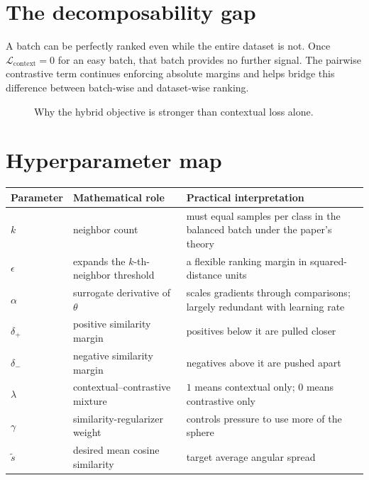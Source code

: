 \documentclass[11pt,oneside,openany]{book}
\theoremstyle{myplain}
\theoremstyle{definition}
\begin{document}
\section{The decomposability gap}

A batch can be perfectly ranked even while the entire dataset is not. Once $\mathcal L_{\mathrm{context}}=0$ for an easy batch, that batch provides no further signal. The pairwise contrastive term continues enforcing absolute margins and helps bridge this difference between batch-wise and dataset-wise ranking.

\begin{figure}[H]
\centering
{}
\caption{Why the hybrid objective is stronger than contextual loss alone.}
\label{fig:decomp-gap}
\end{figure}

\section{Hyperparameter map}

\begin{longtable}{>{\bfseries}p{}p{}p{}}
\toprule
Parameter & Mathematical role & Practical interpretation \\
\midrule
$k$ & neighbor count & must equal samples per class in the balanced batch under the paper's theory \\
$\epsilon$ & expands the $k$-th-neighbor threshold & a flexible ranking margin in squared-distance units \\
$\alpha$ & surrogate derivative of $\theta$ & scales gradients through comparisons; largely redundant with learning rate \\
$\delta_+$ & positive similarity margin & positives below it are pulled closer \\
$\delta_-$ & negative similarity margin & negatives above it are pushed apart \\
$\lambda$ & contextual--contrastive mixture & $1$ means contextual only; $0$ means contrastive only \\
$\gamma$ & similarity-regularizer weight & controls pressure to use more of the sphere \\
$\tilde s$ & desired mean cosine similarity & target average angular spread \\
\bottomrule
\end{longtable}
\end{document}
